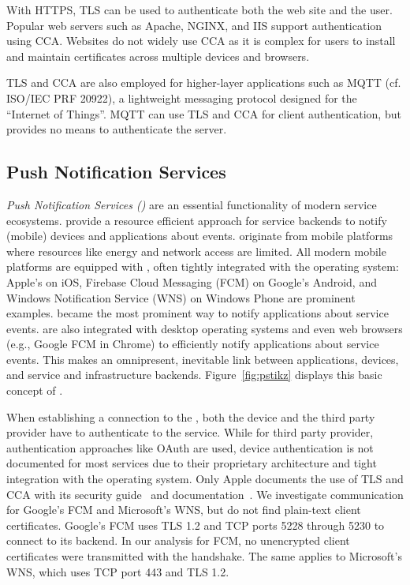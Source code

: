 With HTTPS, TLS can be used to authenticate both the web site and the user.
Popular web servers such as Apache, NGINX, and IIS support authentication using CCA.
Websites do not widely use CCA as it is complex for users to install and maintain certificates across multiple devices and browsers.

{\noindent}TLS and CCA are also employed for higher-layer applications such as MQTT (cf. ISO/IEC PRF 20922), a lightweight messaging protocol designed for the ``Internet of Things''. 
MQTT can use TLS and CCA for client authentication, but provides no means to authenticate the server.

\subsection{Push Notification Services}

\textit{Push Notification Services ({\pnses})} are an essential functionality of modern
service ecosystems. 
{\pnses} provide a resource efficient approach for service backends to notify (mobile) devices and applications about
events. 
{\pnses} originate from mobile platforms where resources like energy and network access are limited.
%
All modern mobile platforms are equipped with {\pnses}, often tightly integrated with the operating system: 
Apple's {\apns} on iOS, Firebase Cloud Messaging (FCM) on Google's Android, and Windows Notification Service (WNS) on Windows Phone are prominent examples. 
{\pnses} became the most prominent way to notify applications about service events. 
{\pnses} are also integrated with desktop operating systems and even web browsers (e.g., Google FCM in Chrome) to efficiently notify applications about service events. 
This makes {\pnses} an omnipresent, inevitable link between applications, devices, and service and infrastructure backends. 
Figure~\ref{fig:pstikz} displays this basic concept of {\pnses}.


When establishing a connection to the {\pns}, both the device and the
third party provider have to authenticate to the service. While for third party
provider, authentication approaches like OAuth are used, device authentication is
not documented for most services due to their proprietary architecture and
tight integration with the operating system. Only Apple documents the use
of TLS and CCA with its security guide~\cite{IosSecurityGuide} and {\apns} documentation~\cite{2016appleapns}.
We investigate communication for Google's FCM and Microsoft's WNS, but do not
find plain-text client certificates. Google's FCM uses TLS 1.2 and TCP ports 5228 through
5230 to connect to its backend. In our analysis for FCM, no
unencrypted client certificates were transmitted with the handshake. The same applies
to Microsoft's WNS, which uses TCP port 443 and TLS 1.2. 


